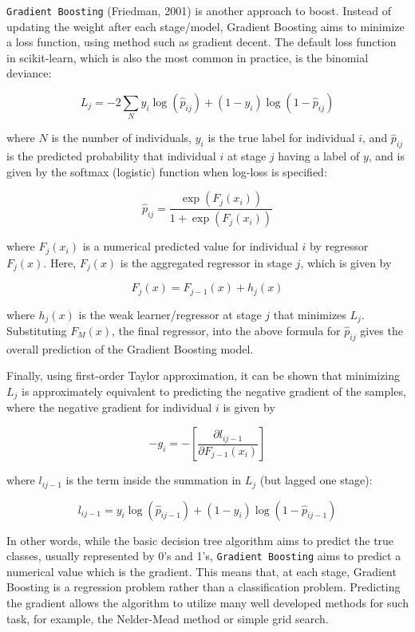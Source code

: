 \documentclass[
]{book}
\theoremstyle{definition}
\theoremstyle{definition}
\theoremstyle{definition}
\theoremstyle{definition}
\theoremstyle{remark}
\begin{document}
\texttt{Gradient\ Boosting} (Friedman, 2001) is another approach to boost. Instead of updating the weight after each stage/model, Gradient Boosting aims to minimize a loss function, using method such as gradient decent. The default loss function in scikit-learn, which is also the most common in practice, is the binomial deviance:

\[L_j = -2\sum_{N}{y_i\log{(\hat{p}_{ij})} + (1-y_i)\log{(1-\hat{p}_{ij})}}\]

where \(N\) is the number of individuals, \(y_i\) is the true label for individual \(i\), and \(\hat{p}_{ij}\) is the predicted probability that individual \(i\) at stage \(j\) having a label of \(y\), and is given by the softmax (logistic) function when log-loss is specified:

\[\hat{p}_{ij} = \frac{\exp{(F_j(x_i))}}{1+\exp{(F_j(x_i))}}\]

where \(F_j(x_i)\) is a numerical predicted value for individual \(i\) by regressor \(F_j(x)\). Here, \(F_j(x)\) is the aggregated regressor in stage \(j\), which is given by

\[F_j(x) = F_{j-1}(x) + h_j(x)\]

where \(h_j(x)\) is the weak learner/regressor at stage \(j\) that minimizes \(L_j\). Substituting \(F_M(x)\), the final regressor, into the above formula for \(\hat{p}_{ij}\) gives the overall prediction of the Gradient Boosting model.

Finally, using first-order Taylor approximation, it can be shown that minimizing \(L_j\) is approximately equivalent to predicting the negative gradient of the samples, where the negative gradient for individual \(i\) is given by

\[-g_i = -\left[\frac{\partial l_{ij-1}}{\partial F_{j-1}(x_i)}\right]\]

where \(l_{ij-1}\) is the term inside the summation in \(L_j\) (but lagged one stage):

\[l_{ij-1} = y_i\log{(\hat{p}_{ij-1})} + (1-y_i)\log{(1-\hat{p}_{ij-1})}\]

In other words, while the basic decision tree algorithm aims to predict the true classes, usually represented by 0's and 1's, \texttt{Gradient\ Boosting} aims to predict a numerical value which is the gradient. This means that, at each stage, Gradient Boosting is a regression problem rather than a classification problem. Predicting the gradient allows the algorithm to utilize many well developed methods for such task, for example, the Nelder-Mead method or simple grid search.
\end{document}
